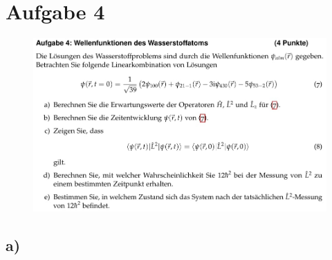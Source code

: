 \section{Aufgabe 4}

    \begin{figure}[H]
        \centering
        \includegraphics[width=\textwidth]{images/Aufgabe4.jpg}
        \label{fig:5}
    \end{figure}

\subsection{a)}

